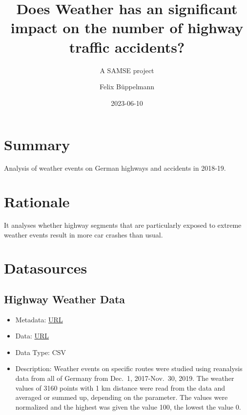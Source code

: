 \documentclass[
  letterpaper,
  DIV=11,
  numbers=noendperiod]{scrartcl}
\title{Does Weather has an significant impact on the number of highway
traffic accidents?}
\subtitle{A SAMSE project}
\author{Felix Büppelmann}
\date{2023-06-10}
\providecommand{\tightlist}{%
  \setlength{\itemsep}{0pt}\setlength{\parskip}{0pt}}\usepackage{longtable,booktabs,array}
\begin{document}
\maketitle
\ifdefined\Shaded\renewenvironment{Shaded}{\begin{tcolorbox}[sharp corners, enhanced, interior hidden, boxrule=0pt, borderline west={3pt}{0pt}{shadecolor}, breakable, frame hidden]}{\end{tcolorbox}}\fi

\hypertarget{summary}{%
\section{Summary}\label{summary}}

Analysis of weather events on German highways and accidents in 2018-19.

\hypertarget{rationale}{%
\section{Rationale}\label{rationale}}

It analyses whether highway segments that are particularly exposed to
extreme weather events result in more car crashes than usual.

\hypertarget{datasources}{%
\section{Datasources}\label{datasources}}

\hypertarget{highway-weather-data}{%
\subsection{Highway Weather Data}\label{highway-weather-data}}

\begin{itemize}
\tightlist
\item
  Metadata:
  \href{https://mobilithek.info/offers/-3534538293975156153}{URL}
\item
  Data:
  \href{https://www.mcloud.de/downloads/mcloud/96EA9CD1-0695-4461-90B1-BC6F6B0E0729/\%3EResultat_HotSpot_Analyse_neu.csv}{URL}
\item
  Data Type: CSV
\item
  Description: Weather events on specific routes were studied using
  reanalysis data from all of Germany from Dec.~1, 2017-Nov.~30, 2019.
  The weather values of 3160 points with 1 km distance were read from
  the data and averaged or summed up, depending on the parameter. The
  values were normalized and the highest was given the value 100, the
  lowest the value 0.
\end{itemize}
\end{document}
